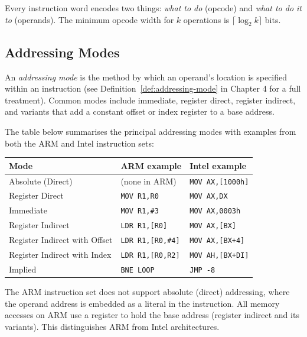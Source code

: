 \documentclass[11pt, a4paper, notitlepage]{report}
\theoremstyle{definition}
\theoremstyle{remark}
\theoremstyle{definition}
\begin{document}
\begin{keyresult}[title={Instruction = Opcode + Operands}]
Every instruction word encodes two things: \emph{what to do} (opcode) and \emph{what to do it to} (operands). The minimum opcode width for $k$ operations is $\lceil \log_2 k \rceil$ bits.
\end{keyresult}

\subsection{Addressing Modes}

An \emph{addressing mode} is the method by which an operand's location is specified within an instruction (see Definition~\ref{def:addressing-mode} in Chapter 4 for a full treatment). Common modes include immediate, register direct, register indirect, and variants that add a constant offset or index register to a base address.

The table below summarises the principal addressing modes with examples from both the ARM and Intel instruction sets:

\begin{center}
\begin{tabular}{lll}
\toprule
\textbf{Mode} & \textbf{ARM example} & \textbf{Intel example} \\
\midrule
Absolute (Direct) & (none in ARM) & \texttt{MOV AX,[1000h]} \\
Register Direct & \texttt{MOV R1,R0} & \texttt{MOV AX,DX} \\
Immediate & \texttt{MOV R1,\#3} & \texttt{MOV AX,0003h} \\
Register Indirect & \texttt{LDR R1,[R0]} & \texttt{MOV AX,[BX]} \\
Register Indirect with Offset & \texttt{LDR R1,[R0,\#4]} & \texttt{MOV AX,[BX+4]} \\
Register Indirect with Index & \texttt{LDR R1,[R0,R2]} & \texttt{MOV AH,[BX+DI]} \\
Implied & \texttt{BNE LOOP} & \texttt{JMP -8} \\
\bottomrule
\end{tabular}
\end{center}

\begin{examtip}[title={ARM Has No Absolute Addressing}]
The ARM instruction set does not support absolute (direct) addressing, where the operand address is embedded as a literal in the instruction. All memory accesses on ARM use a register to hold the base address (register indirect and its variants). This distinguishes ARM from Intel architectures.
\end{examtip}
\end{document}
